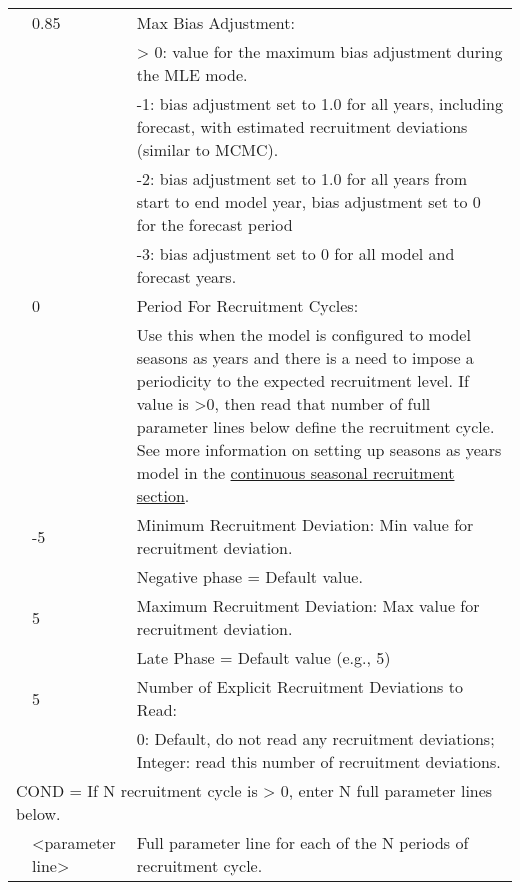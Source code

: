 \begin{longtable}{p{1cm} p{3cm} p{11cm}}
	\Tstrut & 0.85 & Max Bias Adjustment: \\
			&	   & > 0: value for the maximum bias adjustment during the MLE mode. \\
			& 	   & -1: bias adjustment set to 1.0 for all years, including forecast, with estimated recruitment deviations (similar to MCMC). \\
			& 	   & -2: bias adjustment set to 1.0 for all years from start to end model year, bias adjustment set to 0 for the forecast period \\
			& 	   & -3: bias adjustment set to 0 for all model and forecast years. \\

	\Tstrut & 0    & Period For Recruitment Cycles: \\
			&      & Use this when the model is configured to model seasons as years and there is a need to impose a periodicity to the expected recruitment level. If value is >0, then read that number of full parameter lines below define the recruitment cycle. See more information on setting up seasons as years model in the \hyperlink{continuous-seasonal-recruitment-sec}{continuous seasonal recruitment section}. \\
	
	\Tstrut & -5   & Minimum Recruitment Deviation: Min value for recruitment deviation. \\
			&	   & Negative phase = Default value. \\

	\Tstrut & 5	   & Maximum Recruitment Deviation: Max value for recruitment deviation. \\
			&	   & Late Phase = Default value (e.g., 5) \\
	
	\Tstrut & 5   & Number of Explicit Recruitment Deviations to Read: \\
			&      & 0: Default, do not read any recruitment deviations; Integer: read this number of recruitment deviations. \\

	\multicolumn{3}{l}{COND = If N recruitment cycle is > 0, enter N full parameter lines below.} \Tstrut\\
	\Tstrut & <parameter line> & Full parameter line for each of the N periods of recruitment cycle. \Bstrut\\
	\hline


\end{longtable}
